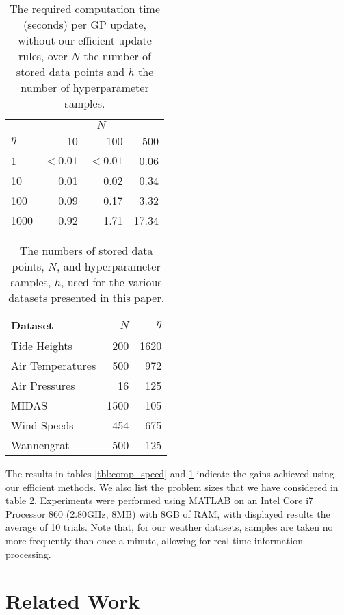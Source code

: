 \documentclass{acmtrans2m}
\begin{document}
\begin{table}
\centering
\caption{The required computation time (seconds) per GP update, without our efficient update rules, over $N$ the number of stored data points and $h$ the number of hyperparameter samples.} 
\label{tbl:comp_speed2} 
\begin{tabular}{@{}lrrr@{}}
\toprule
& \multicolumn{3}{c}{$N$}\\
\cmidrule(l){2-4}
$\eta$ & 10 & 100 & 500 \\
\midrule
1 & $<0.01$ & $<0.01$ & 0.06 \\ 
10 & 0.01 & 0.02 & 0.34 \\
100 & 0.09 & 0.17 & 3.32 \\ 
1000 & 0.92 & 1.71 & 17.34 \\
\bottomrule
\end{tabular}
\end{table}

\begin{table}
\centering
\caption{The numbers of stored data points, $N$, and hyperparameter samples, $h$, used for the various datasets presented in this paper.} 
\label{tbl:numbers_of_samples} 
\begin{tabular}{@{}lrr@{}}
\toprule
Dataset & {$N$} & $\eta$\\
\midrule
Tide Heights & 200 & 1620\\
Air Temperatures & 500 & 972\\
Air Pressures & 16 & 125\\
MIDAS & 1500 & 105 \\
Wind Speeds & 454 & 675\\
Wannengrat & 500 & 125\\
\bottomrule
\end{tabular}
\end{table}


The results in tables \ref{tbl:comp_speed} and \ref{tbl:comp_speed2}  indicate the gains achieved using our efficient methods. We also list the problem sizes that we have considered in table \ref{tbl:numbers_of_samples}. Experiments were performed using MATLAB on an Intel Core i7 Processor 860 (2.80GHz, 8MB) with 8GB of RAM, with displayed results the average of 10 trials.  Note that, for our weather datasets, samples are taken no more frequently than once a minute, allowing for real-time information processing.


\section{Related Work}\label{sec_related}
\end{document}
